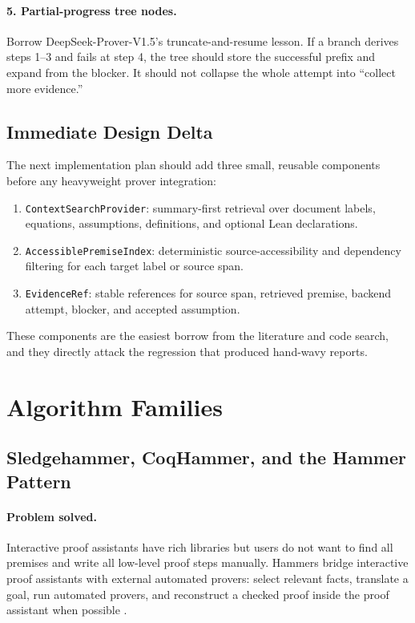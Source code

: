 \documentclass[11pt]{article}
\begin{document}
\paragraph{5. Partial-progress tree nodes.}
Borrow DeepSeek-Prover-V1.5's truncate-and-resume lesson. If a branch derives
steps 1--3 and fails at step 4, the tree should store the successful prefix and
expand from the blocker. It should not collapse the whole attempt into
``collect more evidence.''

\subsection{Immediate Design Delta}

The next implementation plan should add three small, reusable components before
any heavyweight prover integration:

\begin{enumerate}[leftmargin=*]
\item \texttt{ContextSearchProvider}: summary-first retrieval over document
  labels, equations, assumptions, definitions, and optional Lean declarations.
\item \texttt{AccessiblePremiseIndex}: deterministic source-accessibility and
  dependency filtering for each target label or source span.
\item \texttt{EvidenceRef}: stable references for source span, retrieved
  premise, backend attempt, blocker, and accepted assumption.
\end{enumerate}

These components are the easiest borrow from the literature and code search,
and they directly attack the regression that produced hand-wavy reports.

\section{Algorithm Families}

\subsection{Sledgehammer, CoqHammer, and the Hammer Pattern}

\paragraph{Problem solved.}
Interactive proof assistants have rich libraries but users do not want to find
all premises and write all low-level proof steps manually. Hammers bridge
interactive proof assistants with external automated provers: select relevant
facts, translate a goal, run automated provers, and reconstruct a checked proof
inside the proof assistant when possible
\cite{paulson2010sledgehammer,blanchette2016hammering,czarnecki2018hammer}.
\end{document}
